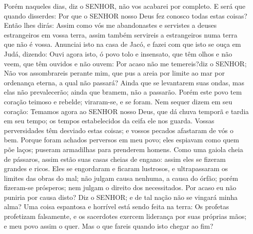 {Porém naqueles dias, diz o SENHOR, não vos acabarei por completo.
E será que quando disserdes: Por que o SENHOR nosso Deus fez conosco todas estas coisas? Então lhes dirás: Assim como vós me abandonastes e servistes a deuses estrangeiros em vossa terra, assim também servireis a estrangeiros numa terra que não é vossa.
Anunciai isto na casa de Jacó, e fazei com que isto se ouça em Judá, dizendo:
Ouvi agora isto, ó povo tolo e insensato,
 que têm olhos e não veem, que têm ouvidos e não ouvem:
Por acaso não me temereis?diz o SENHOR; Não vos assombrareis perante mim, que pus a areia por limite ao mar por ordenança eterna, a qual não passará? Ainda que se levantarem suas ondas, mas elas não prevalecerão; ainda que bramem, não a passarão.
Porém este povo tem coração teimoso e rebelde; viraram-se, e se foram.
Nem sequer dizem em seu coração: Temamos agora ao SENHOR nosso Deus, que dá chuva temporã e tardia em seu tempo; os tempos estabelecidos da ceifa ele nos guarda.
Vossas perversidades têm desviado estas coisas; e vossos pecados afastaram de vós o bem.
Porque foram achados perversos em meu povo; eles espiavam como quem põe laços; puseram armadilhas para prenderem homens.
Como uma gaiola cheia de pássaros, assim estão suas casas cheias de engano: assim eles se fizeram grandes e ricos.
Eles se engordaram e ficaram lustrosos, e ultrapassaram os limites das obras do mal; não julgam causa nenhuma,
{} a causa do órfão; porém fizeram-se prósperos; nem julgam o direito dos necessitados.
Por acaso eu não
{} puniria por causa disto? Diz o SENHOR; e de tal nação não se vingará minha alma?
Uma coisa espantosa e horrível está sendo feita na terra:
Os profetas profetizam falsamente, e os sacerdotes exercem liderança por suas próprias mãos; e meu povo assim o quer. Mas o que fareis quando isto chegar ao fim?

\par }

